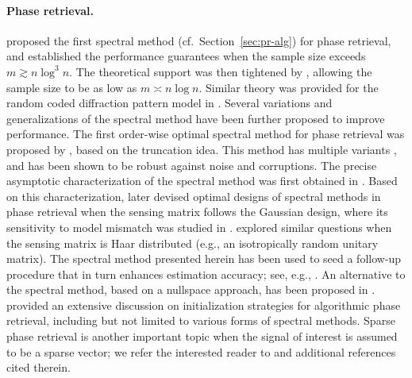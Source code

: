 









\paragraph{Phase retrieval.}


\citet{netrapalli2015phase} proposed the first spectral method (cf.~Section~\ref{sec:pr-alg}) for phase retrieval,
and established the performance guarantees when the sample size exceeds $m\gtrsim n\log^3 n$.
The theoretical support was then tightened by \citet{candes2015phase}, allowing the sample size to be as low as $m \asymp n\log n$.
Similar theory was provided for the random coded diffraction pattern model in \citet{candes2015phase}. Several variations and generalizations of the spectral method have been further proposed to improve performance. The first order-wise optimal spectral method  for phase retrieval was proposed by  \citet{chen2015solving}, based on the truncation idea. This method has multiple variants \citep{zhang2016provable,li2017nonconvex, wang2017solving}, and has been shown to be robust against noise and corruptions. The precise asymptotic characterization of the spectral method was first obtained in \citet{lu2020phase}. Based on this characterization, \citet{mondelli2017fundamental,luo2019optimal} later devised optimal designs of spectral methods in phase retrieval when the sensing matrix follows the Gaussian design, where its sensitivity to model mismatch was studied in \citet{monardo2019sensitivity}. \citet{ma2019spectral,dudeja2020analysis} explored similar questions when the sensing matrix is Haar distributed (e.g., an isotropically random unitary matrix).
The spectral method presented herein has been used to seed a follow-up procedure that in turn enhances estimation accuracy; see, e.g., \citet{netrapalli2015phase,candes2015phase,sanghavi2017local,goldstein2018phasemax,bahmani2016phase,ma2017implicit,chandra2019phasepack,dhifallah2017phase,qu2019convolutional,zhang2017nonconvex,ma2019optimization,tan2019phase,jeong2017convergence,cai2019fast,salehi2018precise}. An alternative to the spectral method, based on a nullspace approach, has been proposed in \citet{chen2017phase}. \citet{fannjiang2020numerics} provided an extensive discussion on initialization strategies for algorithmic phase retrieval, including but not limited to various forms of spectral methods.
Sparse phase retrieval is another important topic when the signal of interest is assumed to be a sparse vector; we refer the interested reader to
\citet{li2013sparse,oymak2012simultaneously,chen2015exact,cai2016optimal,wang66sparse,jagatap2019sample,yang2019misspecified,soltanolkotabi2017structured,yang2016sparse,zhang2018compressive,salehi2018learning,shechtman2014gespar,yuan2019phase,eldar2014phase} and additional references cited therein.




